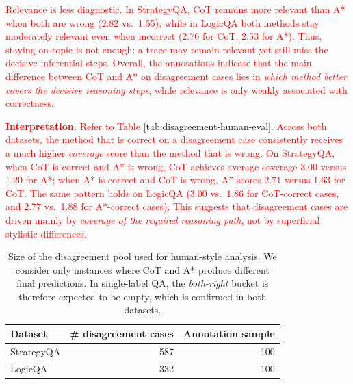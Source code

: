 \documentclass[11pt]{article}
\begin{document}
{\textcolor{red}{\noindent Relevance is less diagnostic. In StrategyQA, CoT remains more relevant than A* when both are wrong (2.82 vs.\ 1.55), while in LogicQA both methods stay moderately relevant even when incorrect (2.76 for CoT, 2.53 for A*). Thus, staying on-topic is not enough: a trace may remain relevant yet still miss the decisive inferential steps. Overall, the annotations indicate that the main difference between CoT and A* on disagreement cases lies in \emph{which method better covers the decisive reasoning steps}, while relevance is only weakly associated with correctness.}


\textcolor{red}{\noindent\textbf{Interpretation.}}
\textcolor{red}{Refer to Table \ref{tab:disagreement-human-eval}. Across both datasets, the method that is correct on a disagreement case consistently receives a much higher \emph{coverage} score than the method that is wrong. On StrategyQA, when CoT is correct and A* is wrong, CoT achieves average coverage 3.00 versus 1.20 for A*; when A* is correct and CoT is wrong, A* scores 2.71 versus 1.63 for CoT. The same pattern holds on LogicQA (3.00 vs.\ 1.86 for CoT-correct cases, and 2.77 vs.\ 1.88 for A*-correct cases). This suggests that disagreement cases are driven mainly by \emph{coverage of the required reasoning path}, not by superficial stylistic differences.}

\begin{table}[t]
\centering
\small
\begin{tabular}{lrr}
\toprule
Dataset & \# disagreement cases & Annotation sample \\
\midrule
StrategyQA & 587 & 100 \\
LogicQA     & 332 & 100 \\
\bottomrule
\end{tabular}
\caption{Size of the disagreement pool used for human-style analysis. We consider only instances where CoT and A* produce different final predictions. In single-label QA, the \textit{both-right} bucket is therefore expected to be empty, which is confirmed in both datasets.}
\label{tab:disagreement-pool}
\end{table}

}
\end{document}
